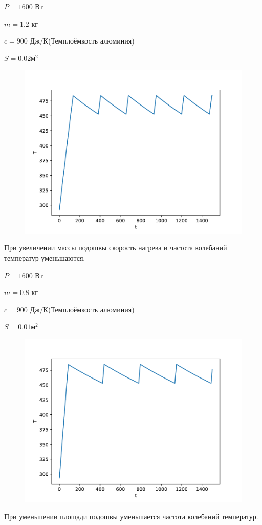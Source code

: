 \documentclass[a4paper, 14pt]{extarticle}
\begin{document}
			$P = 1600$ Вт
			
			$m = 1.2$ кг
			
			$c = 900$ Дж/К(Темплоёмкость алюминия)
			
			$S = 0.02 \text{м}^2$
			
			\begin{figure}[H]
				\centering
				\includegraphics[width = \linewidth]{fig7.pdf}
				\caption[.] {}
			\end{figure}
			При увеличении массы подошвы скорость нагрева и частота колебаний температур уменьшаются.
			\pagebreak
			
			$P = 1600$ Вт
			
			$m = 0.8$ кг
			
			$c = 900$ Дж/К(Темплоёмкость алюминия)
			
			$S = 0.01 \text{м}^2$
			
			\begin{figure}[H]
				\centering
				\includegraphics[width = \linewidth]{fig8.pdf}
				\caption[.] {}
			\end{figure}
			При уменьшении площади подошвы уменьшается частота колебаний температур.
			\pagebreak
			
\end{document}
